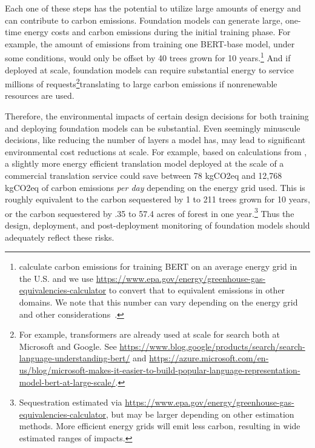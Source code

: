 Each one of these steps has the potential to utilize large amounts of energy and can contribute to carbon emissions. Foundation models can generate large, one-time energy costs and carbon emissions during the initial training phase. For example, the amount of emissions from training one BERT-base model, under some conditions, would only be offset by 40 trees grown for 10 years.\footnote{\citet{strubell2019energy} calculate carbon emissions for training BERT on an average energy grid in the U.S. and we use \url{https://www.epa.gov/energy/greenhouse-gas-equivalencies-calculator} to convert that to equivalent emissions in other domains. We note that this number can vary depending on the energy grid and other considerations~\citep{henderson2020towards,patterson2021carbon}.}
And if deployed at scale, foundation models can require substantial energy to service millions of requests\footnote{For example, transformers are already used at scale for search both at Microsoft and Google. See \url{https://www.blog.google/products/search/search-language-understanding-bert/} and  \url{https://azure.microsoft.com/en-us/blog/microsoft-makes-it-easier-to-build-popular-language-representation-model-bert-at-large-scale/}.}\dash{}translating to large carbon emissions if nonrenewable resources are used.

Therefore, the environmental impacts of certain design decisions for both training and deploying foundation models can be substantial. 
Even seemingly minuscule decisions, like reducing the number of layers a model has, may lead to significant environmental cost reductions at scale. 
For example, based on calculations from \citet{henderson2020towards}, a slightly more energy efficient translation model deployed at the scale of a commercial translation service could save between 78 kgCO2eq and 12,768 kgCO2eq of carbon emissions \textit{per day} depending on the energy grid used.
This is roughly equivalent to the carbon sequestered by 1 to 211 trees grown for 10 years, or the carbon sequestered by .35 to 57.4 acres of forest in one year.\footnote{Sequestration estimated via \url{https://www.epa.gov/energy/greenhouse-gas-equivalencies-calculator}, but may be larger depending on other estimation methods. More efficient energy grids will emit less carbon, resulting in wide estimated ranges of impacts.}
Thus the design, deployment, and post-deployment monitoring of foundation models should adequately reflect these risks.

